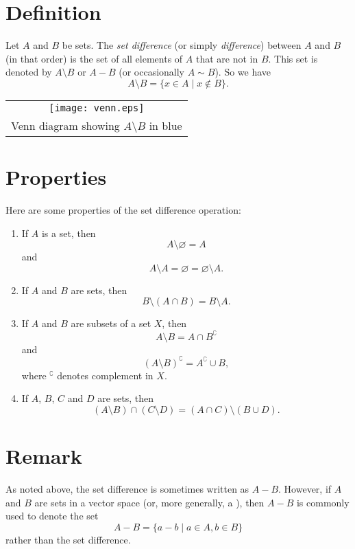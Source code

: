 \documentclass{article}
\def\emptyset{\varnothing}
\begin{document}

\section*{Definition}
Let $A$ and $B$ be sets.
The \emph{set difference} (or simply \emph{difference})
between $A$ and $B$ (in that order)
is the set of all elements of $A$ that are not in $B$.
This set is denoted by $A\setminus B$ or $A-B$
(or occasionally $A\sim B$).   %
So we have
\[
  A\setminus B = \{ x\in A \mid x \notin B\}.
\]

\begin{center}
\begin{tabular}{c}
\texttt{[image: venn.eps]} \\
{\rm Venn diagram showing $A\setminus B$ in blue}
\end{tabular}
\end{center}

\section*{Properties}

Here are some properties of the set difference operation:

\begin{enumerate}

\item If $A$ is a set, then
\[
  A\setminus\emptyset = A
\]
and
\[
  A\setminus A = \emptyset = \emptyset\setminus A.
\]

\item If $A$ and $B$ are sets, then
\[
  B\setminus(A\cap B) = B\setminus A.
\]

\item If $A$ and $B$ are subsets of a set $X$, then
\[
  A\setminus B = A\cap B^\complement
\]
and
\[
  (A\setminus B)^\complement = A^\complement \cup B,
\]
where $^\complement$ denotes complement in $X$.

\item If $A$, $B$, $C$ and $D$ are sets, then 
\[
  (A\setminus B)\cap (C\setminus D) = (A\cap C)\setminus (B\cup D).
\]

\end{enumerate}

\section*{Remark}
As noted above, the set difference is sometimes written as $A-B$. 
However, if $A$ and $B$ are sets in a vector space
(or, more generally, a ),
then $A-B$ is commonly used to denote the set
\[
  A-B = \{ a-b \mid a\in A, b\in B\}
\]
rather than the set difference.
\end{document}
